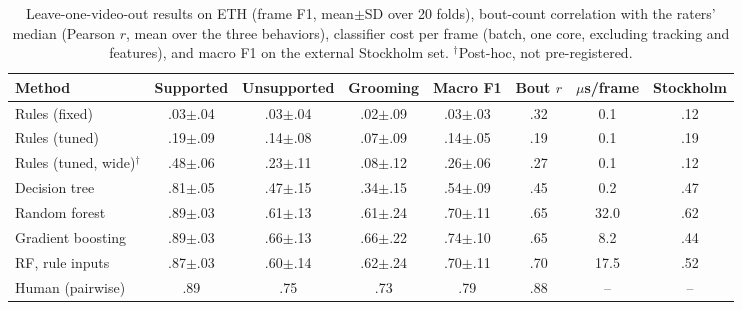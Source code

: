 \begin{table}[t]\centering\caption{Leave-one-video-out results on ETH (frame F1, mean$\pm$SD over 20 folds), bout-count correlation with the raters' median (Pearson $r$, mean over the three behaviors), classifier cost per frame (batch, one core, excluding tracking and features), and macro F1 on the external Stockholm set. $^\dagger$Post-hoc, not pre-registered.}\label{tab:main}
\footnotesize\begin{tabular}{lccccccc}\toprule
Method & Supported & Unsupported & Grooming & Macro F1 & Bout $r$ & $\mu$s/frame & Stockholm\\\midrule
Rules (fixed) & .03$\pm$.04 & .03$\pm$.04 & .02$\pm$.09 & .03$\pm$.03 & .32 & 0.1 & .12 \\
Rules (tuned) & .19$\pm$.09 & .14$\pm$.08 & .07$\pm$.09 & .14$\pm$.05 & .19 & 0.1 & .19 \\
Rules (tuned, wide)$^\dagger$ & .48$\pm$.06 & .23$\pm$.11 & .08$\pm$.12 & .26$\pm$.06 & .27 & 0.1 & .12 \\
\midrule
Decision tree & .81$\pm$.05 & .47$\pm$.15 & .34$\pm$.15 & .54$\pm$.09 & .45 & 0.2 & .47 \\
Random forest & .89$\pm$.03 & .61$\pm$.13 & .61$\pm$.24 & .70$\pm$.11 & .65 & 32.0 & .62 \\
Gradient boosting & .89$\pm$.03 & .66$\pm$.13 & .66$\pm$.22 & .74$\pm$.10 & .65 & 8.2 & .44 \\
RF, rule inputs & .87$\pm$.03 & .60$\pm$.14 & .62$\pm$.24 & .70$\pm$.11 & .70 & 17.5 & .52 \\
\midrule
Human (pairwise) & .89 & .75 & .73 & .79 & .88 & -- & -- \\
\bottomrule\end{tabular}\end{table}
